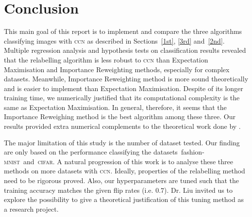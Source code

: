 \documentclass[12pt]{article} %
\newcommand{\rhoo}{\rho_{+1}}
\newcommand{\rhoz}{\rho_{-1}}
\newcommand{\mnist}{fashion-\textsc{mnist}}
\begin{document}




\section{Conclusion}
This main goal of this report is to implement and compare the three algorithms classifying images with \textsc{ccn} as described in Sections~\ref{1st}, \ref{3rd} and~\ref{2nd}. 
Multiple regression analysis and hypothesis tests on classification results revealed that the relabelling algorithm is less robust to \textsc{ccn} than Expectation Maximisation and Importance Reweighting methods, especially for complex datasets. Meanwhile, Importance Reweighting method is more sound theoretically \citep{liu2016classification} and is easier to implement than Expectation Maximisation. 
Despite of its longer training time, we numerically justified that its computational complexity is the same as Expectation Maximisation.
In general, therefore, it seems that the Importance Reweighing method is the best algorithm among these three. 
Our results provided extra numerical complements to the theoretical work done by \citet{liu2016classification}. 

The major limitation of this study is the number of dataset tested. Our finding are only based on the performance classifying the datasets~\mnist\ and~\textsc{cifar}. A natural progression of this work is to analyse these three methods on more datasets with \textsc{ccn}. Ideally, properties of the relabelling method need to be rigorous proved. Also, our hyperparameters are tuned such that the training accuracy matches the given flip rates (i.e. $0.7$). Dr. Liu invited us to explore the possibility to give a theoretical justification of this tuning method as a research project.
\label{headings}



\end{document}
